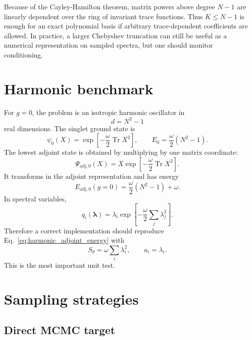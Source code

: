\documentclass[11pt]{article}
\newcommand{\Tr}{\operatorname{Tr}}
\begin{document}
Because of the Cayley-Hamilton theorem, matrix powers above degree $N-1$ are linearly dependent over the ring of invariant trace functions.  Thus $K\leq N-1$ is enough for an exact polynomial basis if arbitrary trace-dependent coefficients are allowed.  In practice, a larger Chebyshev truncation can still be useful as a numerical representation on sampled spectra, but one should monitor conditioning.

\section{Harmonic benchmark}

For $g=0$, the problem is an isotropic harmonic oscillator in
\begin{equation}
d=N^2-1
\end{equation}
real dimensions.  The singlet ground state is
\begin{equation}
\psi_0(X)=\exp\left[-\frac\omega2\Tr X^2\right],
\qquad
E_0=\frac\omega2(N^2-1).
\end{equation}
The lowest adjoint state is obtained by multiplying by one matrix coordinate:
\begin{equation}
\boxed{
\Psi_{\mathrm{adj},0}(X)=X\exp\left[-\frac\omega2\Tr X^2\right].
}
\label{eq:harmonic_adjoint_exact}
\end{equation}
It transforms in the adjoint representation and has energy
\begin{equation}
\boxed{
E_{\mathrm{adj},0}(g=0)=\frac\omega2(N^2-1)+\omega.
}
\label{eq:harmonic_adjoint_energy}
\end{equation}
In spectral variables,
\begin{equation}
q_i(\bm\lambda)=\lambda_i\exp\left[-\frac\omega2\sum_j\lambda_j^2\right].
\end{equation}
Therefore a correct implementation should reproduce Eq.~\eqref{eq:harmonic_adjoint_energy} with
\begin{equation}
S_\theta=\omega\sum_i\lambda_i^2,
\qquad
 a_i=\lambda_i.
\end{equation}
This is the most important unit test.

\section{Sampling strategies}

\subsection{Direct MCMC target}
\end{document}
